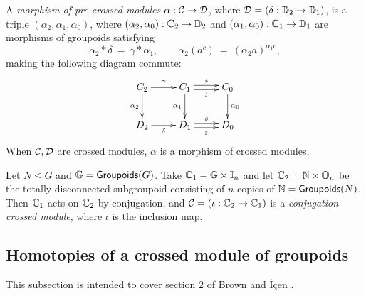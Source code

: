 \medskip 
{}
A \emph{morphism of pre-crossed modules} $\alpha : \mathcal{C} \to \mathcal{D}$, 
where $\mathcal{D} = (\delta : \mathbb{D}_2 \to \mathbb{D}_1)$, 
is a triple  $(\alpha_2, \alpha_1, \alpha_0)$, 
where $(\alpha_2,\alpha_0) : \mathbb{C}_2 \to \mathbb{D}_2$ 
and $(\alpha_1,\alpha_0) : \mathbb{C}_1 \to \mathbb{D}_1$ 
are morphisms of groupoids satisfying 
$$
\alpha_2*\delta ~=~ \gamma*\alpha_1, \qquad
\alpha_2(a^c) ~=~ (\alpha_2 a)^{\alpha_1 c},
$$
making the following diagram commute:
$$
\xymatrix{ 
  C_2 \ar[r]^{\gamma} \ar[d]_{\alpha_2}
    &  C_1 \ar[d]_{\alpha_1} \ar[r]<+0.5ex>^s \ar[r]<-0.5ex>_t 
       &  C_0  \ar[d]^{\alpha_0}  \\
  D_2 \ar[r]_{\delta} 
    &  D_1 \ar[r]<+0.5ex>^s \ar[r]<-0.5ex>_t 
       &  D_0
}
$$
When $\mathcal{C},\mathcal{D}$ are crossed modules, 
$\alpha$ is a morphism of crossed modules.


\begin{example}
Let $N \unlhd G$ and $\mathbb{G} = {\sf Groupoids}(G)$. 
Take $\mathbb{C}_1 = \mathbb{G}\times\mathbb{I}_n$ and let $\mathbb{C}_2 = \mathbb{N} \times \mathbb{O}_n$ 
be the totally disconnected subgroupoid 
consisting of $n$ copies of $\mathbb{N}={\sf Groupoids}(N)$. 
Then $\mathbb{C}_1$ acts on $\mathbb{C}_2$ by conjugation, 
and $\mathcal{C} = (\iota : \mathbb{C}_2 \to \mathbb{C}_1)$ is a 
\emph{conjugation crossed module}, where $\iota$ is the inclusion map. 
\end{example}



\newpage
\subsection{Homotopies of a crossed module of groupoids}

This subsection is intended to cover section 2 of
Brown and \.{I}\c{c}en \cite{brow:icen}.


